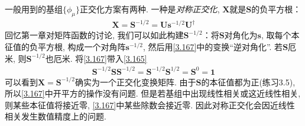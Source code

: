 一般用到的基组$\{\phi_\mu\}$正交化方案有两种. 一种是\emph{对称正交化}, $\mathbf{X}$就是$\mathbf{S}$的负平方根：
\begin{align}\label{3.167}
\mathbf{X} = \mathbf{S}^{-1/2} = \mathbf{U}\mathbf{s}^{-1/2}\mathbf{U}^\dagger
\end{align}
回忆第一章对矩阵函数的讨论, 我们可以如此构建$\mathbf{S}^{-1/2}$：将$\mathbf{S}$对角化为$\mathbf{s}$, 取每个本征值的负平方根, 构成一个对角阵$\mathbf{s}^{-1/2}$, 然后用\eqref{3.167}中的变换``逆对角化”. 若$\mathbf{S}$厄米, 则$\mathbf{S}^{-1/2}$也厄米. 将\eqref{3.167}带入\eqref{3.165}
\begin{align}
\mathbf{S}^{-1/2}\mathbf{SS}^{-1/2} = \mathbf{S}^{-1/2}\mathbf{S}^{1/2} = \mathbf{S}^0 = \mathbf{1}
\end{align} 
可以看到$\mathbf{X=S}^{-1/2}$确实为一个正交化变换矩阵. 由于$\mathbf{S}$的本征值都为正(练习3.5), 所以\eqref{3.167}中开平方的操作没有问题. 但是若基组中出现线性相关或这近线性相关, 则某些本征值将接近零, \eqref{3.167}中某些除数会接近零. 因此对称正交化会因近线性相关发生数值精度上的问题.

